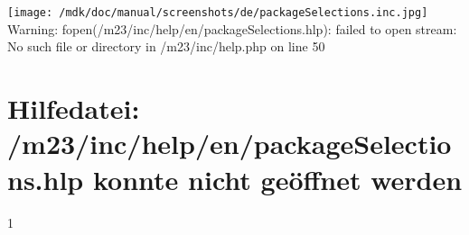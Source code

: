 \section{}
\texttt{[image: /mdk/doc/manual/screenshots/de/packageSelections.inc.jpg]} \\
 Warning: fopen(/m23/inc/help/en/packageSelections.hlp): failed to open stream: No such file or directory in /m23/inc/help.php on line 50 \section{Hilfedatei: /m23/inc/help/en/packageSelections.hlp konnte nicht ge\"offnet werden}
1 

